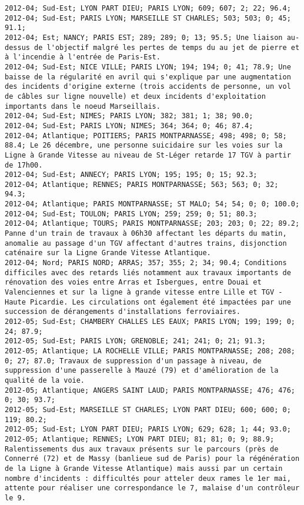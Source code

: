\documentclass{article}
\begin{document}
\begin{Verbatim}[commandchars=\\\{\}]
2012-04; Sud-Est; LYON PART DIEU; PARIS LYON; 609; 607; 2; 22; 96.4; 
2012-04; Sud-Est; PARIS LYON; MARSEILLE ST CHARLES; 503; 503; 0; 45; 91.1; 
2012-04; Est; NANCY; PARIS EST; 289; 289; 0; 13; 95.5; Une liaison au-dessus de l'objectif malgré les pertes de temps du au jet de pierre et à l'incendie à l'entrée de Paris-Est.
2012-04; Sud-Est; NICE VILLE; PARIS LYON; 194; 194; 0; 41; 78.9; Une baisse de la régularité en avril qui s'explique par une augmentation des incidents d'origine externe (trois accidents de personne, un vol de câbles sur ligne nouvelle) et deux incidents d'exploitation importants dans le noeud Marseillais.
2012-04; Sud-Est; NIMES; PARIS LYON; 382; 381; 1; 38; 90.0; 
2012-04; Sud-Est; PARIS LYON; NIMES; 364; 364; 0; 46; 87.4; 
2012-04; Atlantique; POITIERS; PARIS MONTPARNASSE; 498; 498; 0; 58; 88.4; Le 26 décembre, une personne suicidaire sur les voies sur la Ligne à Grande Vitesse au niveau de St-Léger retarde 17 TGV à partir de 17h00.
2012-04; Sud-Est; ANNECY; PARIS LYON; 195; 195; 0; 15; 92.3; 
2012-04; Atlantique; RENNES; PARIS MONTPARNASSE; 563; 563; 0; 32; 94.3; 
2012-04; Atlantique; PARIS MONTPARNASSE; ST MALO; 54; 54; 0; 0; 100.0; 
2012-04; Sud-Est; TOULON; PARIS LYON; 259; 259; 0; 51; 80.3; 
2012-04; Atlantique; TOURS; PARIS MONTPARNASSE; 203; 203; 0; 22; 89.2; Panne d'un train de travaux à 06h30 affectant les départs du matin, anomalie au passage d'un TGV affectant d'autres trains, disjonction caténaire sur la Ligne Grande Vitesse Atlantique.
2012-04; Nord; PARIS NORD; ARRAS; 357; 355; 2; 34; 90.4; Conditions difficiles avec des retards liés notamment aux travaux importants de rénovation des voies entre Arras et Isbergues, entre Douai et Valenciennes et sur la ligne à grande vitesse entre Lille et TGV - Haute Picardie. Les circulations ont également été impactées par une succession de dérangements d'installations ferroviaires.
2012-05; Sud-Est; CHAMBERY CHALLES LES EAUX; PARIS LYON; 199; 199; 0; 24; 87.9; 
2012-05; Sud-Est; PARIS LYON; GRENOBLE; 241; 241; 0; 21; 91.3; 
2012-05; Atlantique; LA ROCHELLE VILLE; PARIS MONTPARNASSE; 208; 208; 0; 27; 87.0; Travaux de suppression d'un passage à niveau, de suppression d'une passerelle à Mauzé (79) et d'amélioration de la qualité de la voie.
2012-05; Atlantique; ANGERS SAINT LAUD; PARIS MONTPARNASSE; 476; 476; 0; 30; 93.7; 
2012-05; Sud-Est; MARSEILLE ST CHARLES; LYON PART DIEU; 600; 600; 0; 119; 80.2; 
2012-05; Sud-Est; LYON PART DIEU; PARIS LYON; 629; 628; 1; 44; 93.0; 
2012-05; Atlantique; RENNES; LYON PART DIEU; 81; 81; 0; 9; 88.9; Ralentissements dus aux travaux présents sur le parcours (près de Connerré (72) et de Massy (banlieue sud de Paris) pour la régénération de la Ligne à Grande Vitesse Atlantique) mais aussi par un certain nombre d'incidents : difficultés pour atteler deux rames le 1er mai, attente pour réaliser une correspondance le 7, malaise d'un contrôleur le 9.

\end{Verbatim}
\end{document}
